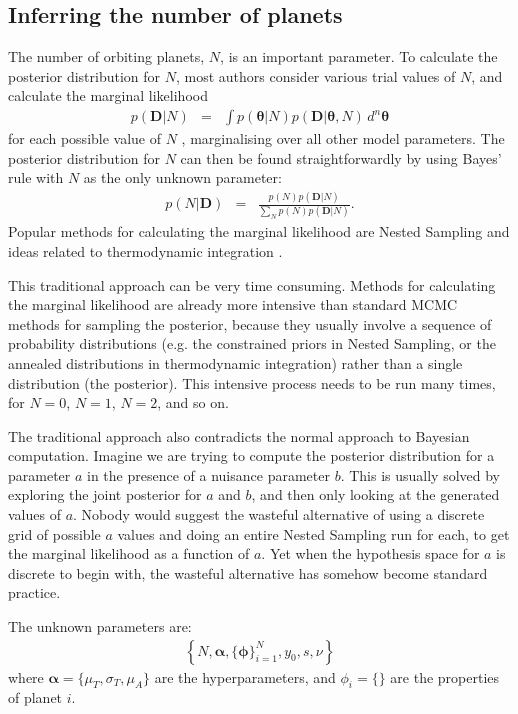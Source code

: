 \documentclass[useAMS,usenatbib]{mn2e}
\renewcommand{\btheta}{\boldsymbol{\theta}}
\newcommand{\bdata}{\boldsymbol{D}}
\begin{document}
\subsection{Inferring the number of planets}
The number of orbiting planets, $N$, is an important parameter.
To calculate the posterior distribution for $N$, most authors
consider various trial values of $N$, and calculate the marginal likelihood
\begin{eqnarray}
p(\bdata | N) &=& \int p(\btheta | N) p(\bdata | \btheta, N) \, d^n \btheta
\end{eqnarray}
for each possible value of $N$
\citep[e.g.][]{2011MNRAS.415.2523G, 2014MNRAS.437.3540F, fengji}, marginalising
over all other model parameters.
The posterior distribution for $N$ can then be found straightforwardly by
using Bayes' rule with $N$ as the only unknown parameter:
\begin{eqnarray}
p(N | \bdata) &=& \frac{p(N)p(\bdata | N)}{\sum_N p(N)p(\bdata | N)}.
\end{eqnarray}
Popular
methods for calculating the marginal likelihood are Nested Sampling
\citep{skilling} and ideas related to thermodynamic integration
\citep[e.g.][]{neal}.

This traditional approach can be very time consuming.
Methods for calculating the marginal likelihood are
already more intensive than standard MCMC methods for sampling the posterior,
because they usually involve a sequence of probability distributions
(e.g. the constrained priors in Nested Sampling, or the annealed distributions
in thermodynamic integration) rather than a single distribution (the posterior).
This intensive process needs to be run many times, for $N=0$, $N=1$, $N=2$, and
so on.

The traditional approach also contradicts the normal approach to Bayesian
computation. Imagine we are trying to compute the posterior distribution for
a parameter $a$ in the presence of a nuisance parameter $b$. This is usually solved
by exploring the joint posterior for $a$ and $b$, and then only looking at the
generated values of $a$. Nobody would suggest the wasteful alternative
of using a discrete grid of possible $a$ values and doing an entire Nested
Sampling run for each, to get the marginal likelihood as a function of $a$.
Yet when the hypothesis space for $a$ is discrete to begin with, the wasteful
alternative has somehow become standard practice.

The unknown parameters are:
\begin{eqnarray}
\left\{N, \boldsymbol{\alpha}, \{\boldsymbol{\phi}\}_{i=1}^N, y_0, s, \nu\right\}
\end{eqnarray}
where $\boldsymbol{\alpha} = \{\mu_T, \sigma_T, \mu_A\}$ are the
hyperparameters, and $\phi_i = \{\}$ are the properties of planet $i$.
\end{document}

